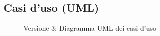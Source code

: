 \subsection{Casi d'uso (UML)}
\vspace{0.5cm}
\begin{figure}[H]
    \centering
    \caption{Versione 3: Diagramma UML dei casi d'uso}
    \label{fig:use_case_uml_v3}
\end{figure}
